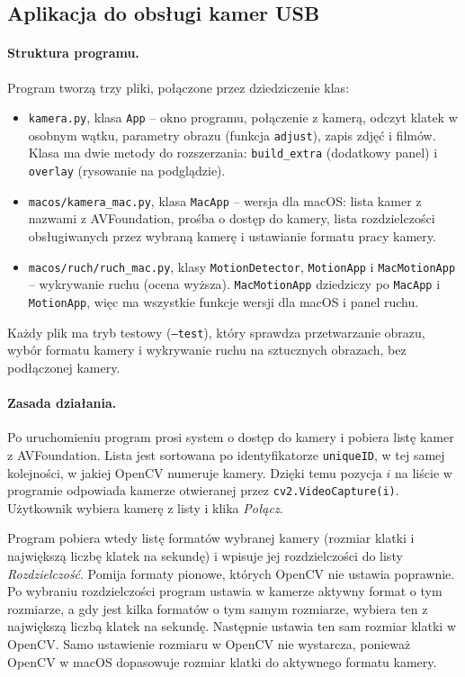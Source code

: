 \subsection{Aplikacja do obsługi kamer USB}
\paragraph{Struktura programu.} Program tworzą trzy pliki, połączone przez dziedziczenie klas:
\begin{itemize}
  \item \texttt{kamera.py}, klasa \texttt{App} -- okno programu, połączenie z kamerą, odczyt
    klatek w osobnym wątku, parametry obrazu (funkcja \texttt{adjust}), zapis zdjęć i filmów.
    Klasa ma dwie metody do rozszerzania: \texttt{build\_extra} (dodatkowy panel) i
    \texttt{overlay} (rysowanie na podglądzie).
  \item \texttt{macos/kamera\_mac.py}, klasa \texttt{MacApp} -- wersja dla macOS: lista kamer
    z nazwami z AVFoundation, prośba o dostęp do kamery, lista rozdzielczości obsługiwanych przez
    wybraną kamerę i ustawianie formatu pracy kamery.
  \item \texttt{macos/ruch/ruch\_mac.py}, klasy \texttt{MotionDetector}, \texttt{MotionApp}
    i \texttt{MacMotionApp} -- wykrywanie ruchu (ocena wyższa). \texttt{MacMotionApp} dziedziczy
    po \texttt{MacApp} i \texttt{MotionApp}, więc ma wszystkie funkcje wersji dla macOS i panel ruchu.
\end{itemize}
Każdy plik ma tryb testowy (\texttt{--test}), który sprawdza przetwarzanie obrazu, wybór formatu
kamery i wykrywanie ruchu na sztucznych obrazach, bez podłączonej kamery.

\paragraph{Zasada działania.} Po uruchomieniu program prosi system o dostęp do kamery i pobiera
listę kamer z AVFoundation. Lista jest sortowana po identyfikatorze \texttt{uniqueID}, w tej samej
kolejności, w jakiej OpenCV numeruje kamery. Dzięki temu pozycja $i$ na liście w programie odpowiada
kamerze otwieranej przez \texttt{cv2.VideoCapture(i)}. Użytkownik wybiera kamerę z listy i klika
\emph{Połącz}.

Program pobiera wtedy listę formatów wybranej kamery (rozmiar klatki i największą liczbę klatek na
sekundę) i wpisuje jej rozdzielczości do listy \emph{Rozdzielczość}. Pomija formaty pionowe, których
OpenCV nie ustawia poprawnie. Po wybraniu rozdzielczości program ustawia w kamerze aktywny format
o tym rozmiarze, a gdy jest kilka formatów o tym samym rozmiarze, wybiera ten z największą liczbą
klatek na sekundę. Następnie ustawia ten sam rozmiar klatki w OpenCV. Samo ustawienie rozmiaru
w OpenCV nie wystarcza, ponieważ OpenCV w macOS dopasowuje rozmiar klatki do aktywnego formatu
kamery.

